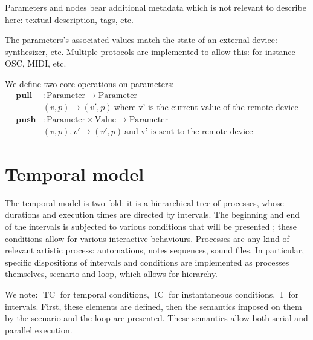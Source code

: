 \documentclass[applsci,article,submit,moreauthors,pdftex,10pt,a4paper]{mdpi}
\DeclareMathOperator{\tc}{TC}
\DeclareMathOperator{\ic}{IC}
\DeclareMathOperator{\itv}{I}
\begin{document}
Parameters and nodes bear additional metadata which is not relevant to describe here: textual description, tags, etc.

The parameters's associated values match the state of an external device: synthesizer, etc.
Multiple protocols are implemented to allow this: for instance OSC, MIDI, etc.

We define two core operations on parameters: 
\begin{align*}
\mathbf{pull} & : \mathrm{Parameter} \rightarrow \mathrm{Parameter} \\
              & (v, p) \mapsto (v', p)~\text{where v' is the current value of the remote device}\\
\mathbf{push} &: \mathrm{Parameter} \times \mathrm{Value} \rightarrow \mathrm{Parameter} \\
              & (v, p), v' \mapsto (v', p)~\text{and v' is sent to the remote device} 
\end{align*}

\section{Temporal model}
The temporal model is two-fold: it is a hierarchical tree of processes, whose durations and execution times are directed by intervals. 
The beginning and end of the intervals is subjected to various conditions that will be presented ; these conditions allow for various 
interactive behaviours. Processes are any kind of relevant artistic process: automations, notes sequences, sound files. 
In particular, specific dispositions of intervals and conditions are implemented as processes themselves, scenario and loop, which allows for hierarchy.

We note: $\tc$ for temporal conditions, $\ic$ for instantaneous conditions, $\itv$ for intervals. 
First, these elements are defined, then the semantics imposed on them by the scenario and the loop are presented.
These semantics allow both serial and parallel execution.
\end{document}
